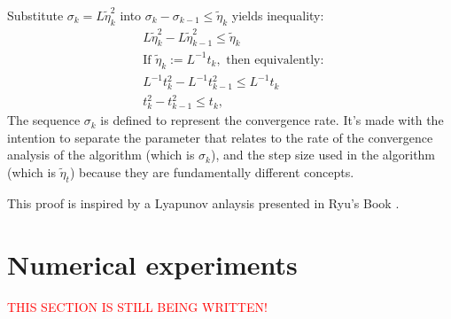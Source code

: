 \documentclass[12pt]{article}
\begin{document}
    \begin{observation}
        Substitute $\sigma_k = L \tilde \eta_k^2$ into $\sigma_k - \sigma_{k - 1} \le \tilde \eta_k$ yields inequality:
        \begin{align*}
            & L \tilde \eta_k^2 - L \tilde \eta_{k - 1}^2 
            \le 
            \tilde \eta_k
            \\
            & \text{If }  \tilde \eta_k := L^{-1} t_k, \text{ then equivalently: }
            \\
            & L^{-1}t_k^2 - L^{-1}t_{k - 1}^2
            \le L^{-1}t_k 
            \\
            & 
            t_k^2 - t_{k - 1}^2
            \le t_k, 
        \end{align*}
        The sequence $\sigma_k$ is defined to represent the convergence rate. 
        It's made with the intention to separate the parameter that relates to the rate of the convergence analysis of the algorithm (which is $\sigma_k$), and the step size used in the algorithm (which is $\tilde \eta_t$) because they are fundamentally different concepts. 
    \end{observation}
    \begin{remark}
        This proof is inspired by a Lyapunov anlaysis presented in Ryu's Book \cite[Chapter 12]{ryu_large-scale_2022}. 
    \end{remark}

\section{Numerical experiments}\label{sec:numerical-experiments}
    \textcolor{red}{THIS SECTION IS STILL BEING WRITTEN! }
    
\end{document}
